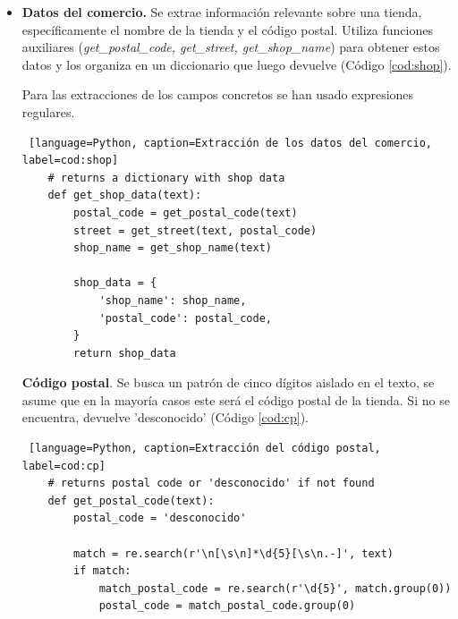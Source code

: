 \begin{itemize}
    \begin{lstlisting} [language=Python, caption=Extracción la fecha en un ticket, label=cod:fecha]
    # returns date with dd/mm/aaaa format o 'desconocido' if not found
    def get_date(text):
        date = 'desconocido'
        text = text.replace(' ', '')

        date = get_date_dd_mm_yyyy(text)
        if date == 'desconocido':
            date = get_date_dd_mm_yy(text)   
            if date == 'desconocido':
                date = get_date_yyyy_mm_dd(text)

        return date
    \end{lstlisting}

    \item \textbf{Datos del comercio.} Se extrae información relevante sobre una tienda, específicamente el nombre de la tienda y el código postal. Utiliza funciones auxiliares (\textit{get\_postal\_code, get\_street, get\_shop\_name}) para obtener estos datos y los organiza en un diccionario que luego devuelve (Código \ref{cod:shop}).
    
    Para las extracciones de los campos concretos se han usado expresiones regulares.  

    \begin{lstlisting} [language=Python, caption=Extracción de los datos del comercio, label=cod:shop]
    # returns a dictionary with shop data
    def get_shop_data(text):
        postal_code = get_postal_code(text)
        street = get_street(text, postal_code)
        shop_name = get_shop_name(text)

        shop_data = {
            'shop_name': shop_name,
            'postal_code': postal_code,
        }
        return shop_data
    \end{lstlisting}

\subitem \textbf{Código postal}. Se busca un patrón de cinco dígitos aislado en el texto, se asume que en la mayoría casos este será el código postal de la tienda. Si no se encuentra, devuelve 'desconocido' (Código \ref{cod:cp}). \label{item:codigo_postal}
    \begin{lstlisting} [language=Python, caption=Extracción del código postal, label=cod:cp]
    # returns postal code or 'desconocido' if not found
    def get_postal_code(text):
        postal_code = 'desconocido'

        match = re.search(r'\n[\s\n]*\d{5}[\s\n.-]', text)
        if match:
            match_postal_code = re.search(r'\d{5}', match.group(0))
            postal_code = match_postal_code.group(0)


\end{lstlisting}
\end{itemize}
